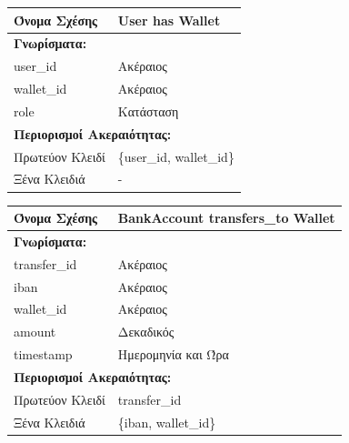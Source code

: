 \noindent
\begin{tabular}{|p{6cm}|p{6cm}|}
\hline
\textbf{Όνομα Σχέσης} & User has Wallet\\ \hline

\multicolumn{2}{|l|}{\textbf{Γνωρίσματα:}} \\ \hline
user\_id & Ακέραιος \\ \hline
wallet\_id & Ακέραιος \\ \hline
role & Κατάσταση \\ \hline

\multicolumn{2}{|l|}{\textbf{Περιορισμοί Ακεραιότητας:}} \\ \hline
Πρωτεύον Κλειδί & \{user\_id, wallet\_id\} \\ \hline
Ξένα Κλειδιά & - \\ \hline
\end{tabular}

\vspace{1cm}

\noindent
\begin{tabular}{|p{6cm}|p{6cm}|}
\hline
\textbf{Όνομα Σχέσης} & BankAccount transfers\_to Wallet \\ \hline

\multicolumn{2}{|l|}{\textbf{Γνωρίσματα:}} \\ \hline
transfer\_id & Ακέραιος \\ \hline
iban & Ακέραιος \\ \hline
wallet\_id & Ακέραιος \\ \hline
amount & Δεκαδικός \\ \hline
timestamp & Ημερομηνία και Ώρα \\ \hline

\multicolumn{2}{|l|}{\textbf{Περιορισμοί Ακεραιότητας:}} \\ \hline
Πρωτεύον Κλειδί & transfer\_id \\ \hline
Ξένα Κλειδιά & \{iban, wallet\_id\} \\ \hline
\end{tabular}

\vspace{1cm}

